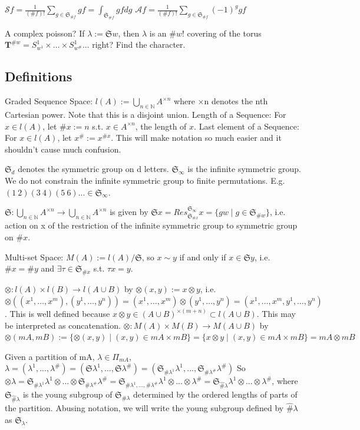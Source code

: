 \documentclass{article}
\begin{document}
$\mathcal{S}f = \frac{1}{(\#f)!}\sum_{g\in \mathfrak{S}_{\#f}}gf = \int_{\mathfrak{S}_{\#f}} gf dg $
$\mathcal{A}f = \frac{1}{(\#f)!}\sum_{g\in \mathfrak{S}_{\#f}} (-1)^g gf $

A complex poisson? If $\lambda :=\mathfrak{S}w$, then $\lambda$ is an $ \#w !$ covering of the torus $\mathbf{T}^{\#w}=S^1_{w^1}\times\dots\times S^1_{w^\#}$... right? Find the character. 

\subsection{Definitions}
Graded Sequence Space: $l(A):= \bigcup_{n\in\mathbb{N}}A^{\times n}$ where ×n denotes the nth Cartesian power. Note that this is a disjoint union.
Length of a Sequence: For $x\in l(A)$, let $\#x:=n $ s.t. $ x\in A^{\times n}$, the length of $x$.
Last element of a Sequence: For $x \in l(A)$, let $x^\# := x^{\#x}$. This will make notation so much easier and it shouldn't cause much confusion.

$\mathfrak{S}_d$ denotes the symmetric group on d letters. $\mathfrak{S}_\infty $ is the infinite symmetric group. We do not constrain the infinite symmetric group to finite permutations. E.g. $(1\:2)(3\:4)(5\:6)... \in \mathfrak{S}_\infty$.

$\mathfrak{S}: \bigcup_{n\in\mathbb{N}} A^{\times n} \rightarrow \bigcup_{n\in\mathbb{N}} A^{\times n} $ is given by $\mathfrak{S}x = Res^{\mathfrak{S}_\infty}_{\mathfrak{S}_{\#x}}x = \{gw\mid g \in \mathfrak{S}_{\#w}\}$, i.e. action on x of the restriction of the infinite symmetric group to symmetric group on $\#x$.

Multi-set Space: $M(A) := l(A)/\mathfrak{S}$, so  $x\sim y$ if and only if $x \in \mathfrak{S}y$, i.e. $\#x=\#y $ and $\exists \tau \in \mathfrak{S}_{\#x}$ s.t. $\tau x=y$.

$\otimes:l(A)\times l(B)\rightarrow l(A\cup B)$ by $\otimes(x,y):=x\otimes y $, i.e. $ \otimes((x^1,\dots,x^m),(y^1,\dots,y^n)) =  (x^1,\dots,x^m)\otimes(y^1,\dots,y^n) =(x^1,\dots,x^m,y^1,\dots,y^n)$.
This is well defined because $x\otimes y \in (A\cup B)^{\times(m+n)} \subset l(A\cup B)$. This may be interpreted as concatenation.
$\otimes:M(A)\times M(B)\rightarrow M(A\cup B)$  by $\otimes(mA,mB):=\{\otimes(x,y) \mid (x,y)\in mA\times mB\} = \{x \otimes y \mid (x,y)\in mA\times mB\} = mA\otimes mB$

Given a partition of mA, $\lambda \in \Pi_{mA}$, $\lambda = (\lambda^1,..., \lambda^{\#}) = (\mathfrak{S}\lambda^1,..., \mathfrak{S}\lambda^{\#})  =  (\mathfrak{S}_{\#\lambda^1}\lambda^1,..., \mathfrak{S}_{\#\lambda^{\#}}\lambda^{\#}) $
So $\otimes\lambda = \mathfrak{S}_{\#\lambda^1}\lambda^1\otimes...\otimes\mathfrak{S}_{\#\lambda^{\#}}\lambda^{\#} =\mathfrak{S}_{\#\lambda^1, ..., \#\lambda^{\#}} \lambda^1\otimes...\otimes\lambda^{\#} = \mathfrak{S}_{\hat{\#}\lambda}\lambda^1\otimes...\otimes\lambda^{\#}  $, where $\mathfrak{S}_{\hat\#\lambda}$ is the young subgroup of $\mathfrak{S}_{\#\lambda}$ determined by the ordered lengths of parts of the partition. Abusing notation, we will write the young subgroup defined by $\hat\#\lambda$ as $\mathfrak{S}_{\lambda}$.
\end{document}
